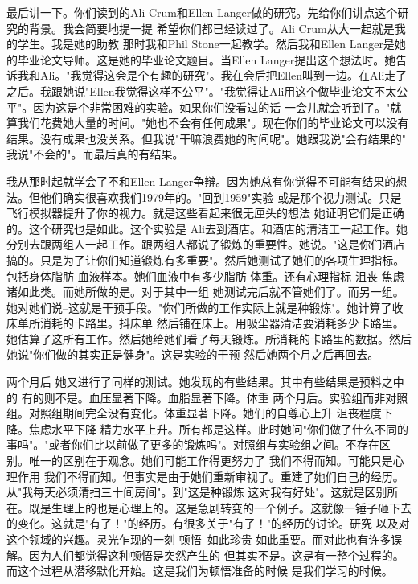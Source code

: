 最后讲一下。你们读到的Ali Crum和Ellen Langer做的研究。先给你们讲点这个研究的背景。我会简要地提一提 希望你们都已经读过了。Ali Crum从大一起就是我的学生。我是她的助教 那时我和Phil Stone一起教学。然后我和Ellen Langer是她的毕业论文导师。这是她的毕业论文题目。当Ellen Langer提出这个想法时。她告诉我和Ali。"我觉得这会是个有趣的研究"。我在会后把Ellen叫到一边。在Ali走了之后。我跟她说"Ellen我觉得这样不公平"。"我觉得让Ali用这个做毕业论文不太公平"。因为这是个非常困难的实验。如果你们没看过的话 一会儿就会听到了。"就算我们花费她大量的时间。"她也不会有任何成果"。现在你们的毕业论文可以没有结果。没有成果也没关系。但我说"干嘛浪费她的时间呢"。她跟我说"会有结果的" 我说"不会的"。而最后真的有结果。 

我从那时起就学会了不和Ellen Langer争辩。因为她总有你觉得不可能有结果的想法。但他们确实很喜欢我们1979年的。"回到1959"实验 或是那个视力测试。只是飞行模拟器提升了你的视力。就是这些看起来很无厘头的想法 她证明它们是正确的。这个研究也是如此。这个实验是 Ali去到酒店。和酒店的清洁工一起工作。她分别去跟两组人一起工作。跟两组人都说了锻炼的重要性。她说。"这是你们酒店搞的。只是为了让你们知道锻炼有多重要"。然后她测试了她们的各项生理指标。包括身体脂肪 血液样本。她们血液中有多少脂肪 体重。还有心理指标 沮丧 焦虑 诸如此类。而她所做的是。对于其中一组 她测试完后就不管她们了。而另一组。她对她们说--这就是干预手段。"你们所做的工作实际上就是种锻炼"。她计算了收床单所消耗的卡路里。抖床单 然后铺在床上。用吸尘器清洁要消耗多少卡路里。她估算了这所有工作。然后她给她们看了每天锻炼。所消耗的卡路里的数据。然后她说"你们做的其实正是健身"。这是实验的干预 然后她两个月之后再回去。 

两个月后 她又进行了同样的测试。她发现的有些结果。其中有些结果是预料之中的 有的则不是。血压显著下降。血脂显著下降。体重 两个月后。实验组而非对照组。对照组期间完全没有变化。体重显著下降。她们的自尊心上升 沮丧程度下降。焦虑水平下降 精力水平上升。所有都是这样。此时她问"你们做了什么不同的事吗"。"或者你们比以前做了更多的锻炼吗"。对照组与实验组之间。不存在区别。唯一的区别在于观念。她们可能工作得更努力了 我们不得而知。可能只是心理作用 我们不得而知。但事实是由于她们重新审视了。重建了她们自己的经历。从"我每天必须清扫三十间房间"。到"这是种锻炼 这对我有好处"。这就是区别所在。既是生理上的也是心理上的。这是急剧转变的一个例子。这就像一锤子砸下去的变化。这就是"有了！"的经历。有很多关于"有了！"的经历的讨论。研究 以及对这个领域的兴趣。灵光乍现的一刻 顿悟--如此珍贵 如此重要。而对此也有许多误解。因为人们都觉得这种顿悟是突然产生的 但其实不是。这是有一整个过程的。而这个过程从潜移默化开始。这是我们为顿悟准备的时候 是我们学习的时候。 

